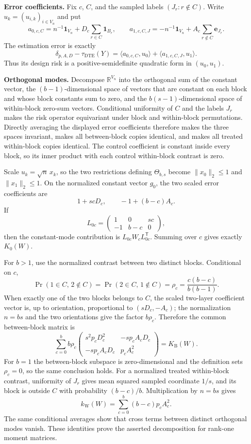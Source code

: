 \textbf{Error coefficients.} Fix \(c\), \(C\), and the sampled labels \((J_r:r\notin C)\). Write \(u_k=(u_{i,k})_{i\in V_n}\) and put
\[
a_{0,c,C}=n^{-1}\mathbf 1_{V_n}+D_c\sum_{r\in C}\mathbf 1_{B_r},
\qquad
a_{1,c,C,J}=-n^{-1}\mathbf 1_{V_n}+A_c\sum_{r\notin C}\mathbf e_{J_r}.
\]
The estimation error is exactly
\[
\delta_{p,A,D}-\tau_{\mathrm{DTE}}(Y)
=\langle a_{0,c,C},u_0\rangle+\langle a_{1,c,C,J},u_1\rangle.
\]
Thus its design risk is a positive-semidefinite quadratic form in \((u_0,u_1)\).

\textbf{Orthogonal modes.} Decompose \(\mathbb R^{V_n}\) into the orthogonal sum of the constant vector, the \((b-1)\)-dimensional space of vectors that are constant on each block and whose block constants sum to zero, and the \(b(s-1)\)-dimensional space of within-block zero-sum vectors. Conditional uniformity of \(C\) and the labels \(J_r\) makes the risk operator equivariant under block and within-block permutations. Directly averaging the displayed error coefficients therefore makes the three spaces invariant, makes all between-block copies identical, and makes all treated within-block copies identical. The control coefficient is constant inside every block, so its inner product with each control within-block contrast is zero.

Scale \(u_k=\sqrt n\,x_k\), so the two restrictions defining \(\Theta_{b,s}\) become \(\|x_0\|_2\le1\) and \(\|x_1\|_2\le1\). On the normalized constant vector \(g_0\), the two scaled error coefficients are
\[
1+scD_c,
\qquad
-1+(b-c)A_c.
\]
If
\[
L_{0c}=\begin{pmatrix}1&0&sc\\-1&b-c&0\end{pmatrix},
\]
then the constant-mode contribution is \(L_{0c}W_cL_{0c}^{\mathsf T}\). Summing over \(c\) gives exactly \(K_0(W)\).

For \(b>1\), use the normalized contrast between two distinct blocks. Conditional on \(c\),
\[
\Pr(1\in C,\,2\notin C)=\Pr(2\in C,\,1\notin C)
=\rho_c=\frac{c(b-c)}{b(b-1)}.
\]
When exactly one of the two blocks belongs to \(C\), the scaled two-layer coefficient vector is, up to orientation, proportional to \((sD_c,-A_c)\); the normalization \(n=bs\) and the two orientations give the factor \(b\rho_c\). Therefore the common between-block matrix is
\[
\sum_{c=0}^b b\rho_c
\begin{pmatrix}
s^2p_cD_c^2&-sp_cA_cD_c\\
-sp_cA_cD_c&p_cA_c^2
\end{pmatrix}
=K_{\mathrm B}(W).
\]
For \(b=1\) the between-block subspace is zero-dimensional and the definition sets \(\rho_c=0\), so the same conclusion holds. For a normalized treated within-block contrast, uniformity of \(J_r\) gives mean squared sampled coordinate \(1/s\), and its block is outside \(C\) with probability \((b-c)/b\). Multiplication by \(n=bs\) gives
\[
k_{\mathrm W}(W)=\sum_{c=0}^b(b-c)p_cA_c^2.
\]
The same conditional averages show that cross terms between distinct orthogonal modes vanish. These identities prove the asserted decomposition for rank-one moment matrices.


